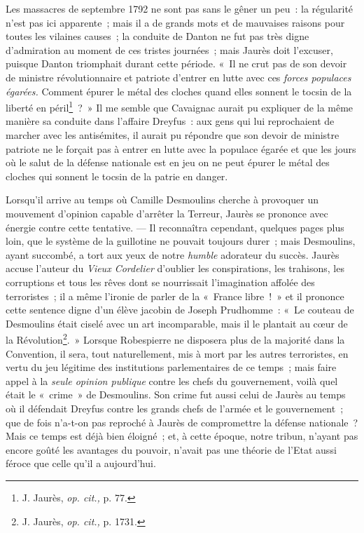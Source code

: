 \documentclass[french,twoside]{book} %
\begin{document}
Les massacres de septembre 1792 ne sont pas sans le gêner un peu : la régularité n’est pas ici apparente ; mais il a de grands mots et de mauvaises raisons pour toutes les vilaines causes ; la conduite de Danton ne fut pas très digne d’admiration au moment de ces tristes journées ; mais Jaurès doit l’excuser, puisque Danton triomphait durant cette période. « Il ne crut pas de son devoir de ministre révolutionnaire et patriote d’entrer en lutte avec ces \emph{forces populaces égarées.} Comment épurer le métal des cloches quand elles sonnent le tocsin de la liberté en péril\footnote{ \noindent J. Jaurès, \emph{op. cit.,} p. 77.
 } ? » Il me semble que Cavaignac aurait pu expliquer de la même manière sa conduite dans l’affaire Dreyfus : aux gens qui lui reprochaient de marcher avec les antisémites, il aurait pu répondre que son devoir de ministre patriote ne le forçait pas à entrer en lutte avec la populace égarée et que les jours où le salut de la défense nationale est en jeu on ne peut épurer le  métal des cloches qui sonnent le tocsin de la patrie en danger.\par
Lorsqu’il arrive au temps où Camille Desmoulins cherche à provoquer un mouvement d’opinion capable d’arrêter la Terreur, Jaurès se prononce avec énergie contre cette tentative. — Il reconnaîtra cependant, quelques pages plus loin, que le système de la guillotine ne pouvait toujours durer ; mais Desmoulins, ayant succombé, a tort aux yeux de notre \emph{humble} adorateur du succès. Jaurès accuse l’auteur du \emph{Vieux Cordelier} d’oublier les conspirations, les trahisons, les corruptions et tous les rêves dont se nourrissait l’imagination affolée des terroristes ; il a même l’ironie de parler de la « France libre ! » et il prononce cette sentence digne d’un élève jacobin de Joseph Prudhomme : « Le couteau de Desmoulins était ciselé avec un art incomparable, mais il le plantait au cœur de la Révolution\footnote{ \noindent J. Jaurès, \emph{op. cit.,} p. 1731.
 }. » Lorsque Robespierre ne disposera plus de la majorité dans la Convention, il sera, tout naturellement, mis à mort par les autres terroristes, en vertu du jeu légitime des institutions parlementaires de ce temps ; mais faire appel à la \emph{seule opinion publique} contre les chefs du gouvernement, voilà quel était le « crime » de Desmoulins. Son crime fut aussi celui de Jaurès au temps où il défendait Dreyfus contre les grands chefs de l’armée et le gouvernement ; que de fois n’a-t-on pas reproché à Jaurès de compromettre la défense nationale ? Mais ce temps est déjà bien éloigné ; et, à cette époque, notre tribun, n’ayant pas  encore goûté les avantages du pouvoir, n’avait pas une théorie de l’Etat aussi féroce que celle qu’il a aujourd’hui.\par
\end{document}
